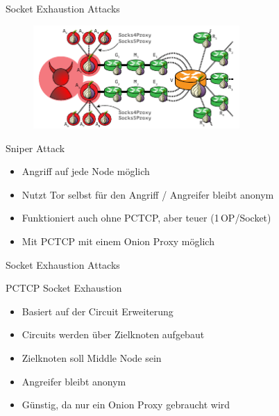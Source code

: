 \documentclass{beamer}
\begin{document}
\begin{frame}{Socket Exhaustion Attacks}{\secname}
  \begin{figure}[h]
    \begin{center}
      \includegraphics[width=0.7\textwidth]{pics/sniper}
    \end{center}
  \end{figure} 
  \begin{block}{Sniper Attack}
    \begin{itemize}
      \item Angriff auf jede Node möglich
      \item Nutzt Tor selbst für den Angriff / Angreifer bleibt anonym
      \item Funktioniert auch ohne PCTCP, aber teuer (1\,OP/Socket)
      \item Mit PCTCP mit einem Onion Proxy möglich
    \end{itemize}
  \end{block}
\end{frame}


\begin{frame}{Socket Exhaustion Attacks}{\secname}
  \begin{block}{PCTCP Socket Exhaustion}
    \begin{itemize}
      \item Basiert auf der Circuit Erweiterung
      \item Circuits werden über Zielknoten aufgebaut
      \item Zielknoten soll Middle Node sein
      \item Angreifer bleibt anonym
      \item Günstig, da nur ein Onion Proxy gebraucht wird
    \end{itemize}
  \end{block}
\end{frame}

\end{document}

